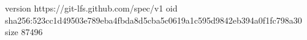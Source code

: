 version https://git-lfs.github.com/spec/v1
oid sha256:523cc1d49503e789eba4fbda8d5cba5c0619a1c595d9842eb394a0f1fc798a30
size 87496
